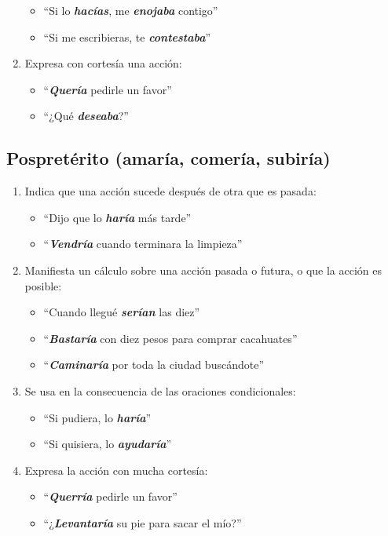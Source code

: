 \documentclass[14pt]{extarticle}
\newcommand{\marcatexto}[1]{\textbf{\textit{#1}}}
\begin{document}
\begin{enumerate}[label=\alph*)]
\begin{itemize}
\item \enquote{Si lo \marcatexto{hacías}, me \marcatexto{enojaba} contigo}
\item \enquote{Si me escribieras, te \marcatexto{contestaba}}
\end{itemize}
\item Expresa con cortesía una acción:
\begin{itemize}
\item \enquote{\marcatexto{Quería} pedirle un favor}
\item \enquote{¿Qué \marcatexto{deseaba}?}
\end{itemize}
\end{enumerate}

\subsection{Pospretérito (amaría, comería, subiría)}

\begin{enumerate}[label=\alph*)]
\item Indica que una acción sucede después de otra que es pasada:
\begin{itemize}
\item \enquote{Dijo que lo \marcatexto{haría} más tarde}
\item \enquote{\marcatexto{Vendría} cuando terminara la limpieza}
\end{itemize}
\item Manifiesta un cálculo sobre una acción pasada o futura, o que la acción es posible:
\begin{itemize}
\item \enquote{Cuando llegué \marcatexto{serían} las diez}
\item \enquote{\marcatexto{Bastaría} con diez pesos para comprar cacahuates}
\item \enquote{\marcatexto{Caminaría} por toda la ciudad buscándote}
\end{itemize}
\item Se usa en la consecuencia de las oraciones condicionales:
\begin{itemize}
\item \enquote{Si pudiera, lo \marcatexto{haría}}
\item \enquote{Si quisiera, lo \marcatexto{ayudaría}}
\end{itemize}
\item Expresa la acción con mucha cortesía:
\begin{itemize}
\item  \enquote{\marcatexto{Querría} pedirle un favor}
\item  \enquote{¿\marcatexto{Levantaría} su pie para sacar el mío?}
\end{itemize}
\end{enumerate}
\end{document}
